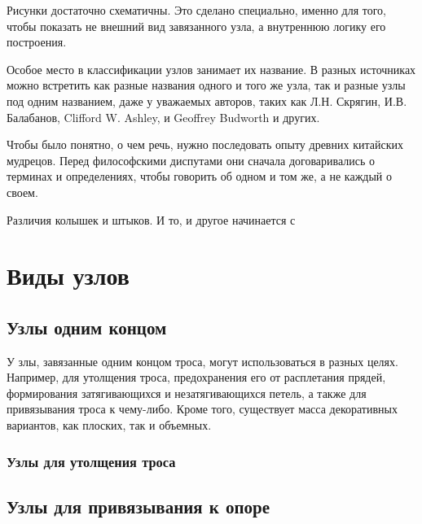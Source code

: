 \documentclass{book}
\begin{document}
Рисунки достаточно схематичны. Это сделано специально, именно для того, чтобы показать не внешний вид завязанного узла, а внутреннюю логику его построения.

Особое место в классификации узлов занимает их название. В разных источниках можно встретить как разные названия одного и того же узла, так и разные узлы под одним названием, даже у уважаемых авторов, таких как Л.Н. Скрягин\citep{Skryagin}, И.В. Балабанов\citep{Balabanov}, Clifford W. Ashley\citep{Ashley}, и Geoffrey Budworth\citep{Budworth} и других.

Чтобы было понятно, о чем речь, нужно последовать опыту древних китайских мудрецов. Перед философскими диспутами они сначала договаривались о терминах и определениях, чтобы говорить об одном и том же, а не каждый о своем.

Различия колышек и штыков. И то, и другое начинается с

\part{Виды узлов}

\chapter{Узлы одним концом}

\lettrine[lines=3,loversize=0.2,nindent=-3pt,slope=-3pt]{У}{} злы, завязанные одним концом троса, могут использоваться в разных целях. Например, для утолщения троса, предохранения его от расплетания прядей, формирования затягивающихся и незатягивающихся петель, а также для привязывания троса к чему-либо. Кроме того, существует масса декоративных вариантов, как плоских, так и объемных.

\section{Узлы для утолщения троса}











\chapter{Узлы для привязывания к опоре}
\end{document}
